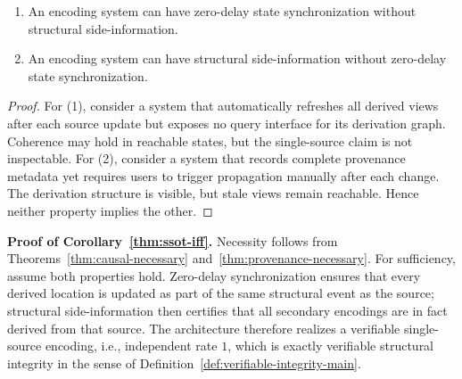 \begin{theorem}\label{thm:independence}
\begin{enumerate}
\tightlist
\item An encoding system can have zero-delay state synchronization without structural side-information.
\item An encoding system can have structural side-information without zero-delay state synchronization.
\end{enumerate}
\end{theorem}

\begin{proof}
For (1), consider a system that automatically refreshes all derived views after each source update but exposes no query interface for its derivation graph. Coherence may hold in reachable states, but the single-source claim is not inspectable. For (2), consider a system that records complete provenance metadata yet requires users to trigger propagation manually after each change. The derivation structure is visible, but stale views remain reachable. Hence neither property implies the other.
\end{proof}

\noindent\textbf{Proof of Corollary~\ref{thm:ssot-iff}.}
Necessity follows from Theorems~\ref{thm:causal-necessary} and~\ref{thm:provenance-necessary}. For sufficiency, assume both properties hold. Zero-delay synchronization ensures that every derived location is updated as part of the same structural event as the source; structural side-information then certifies that all secondary encodings are in fact derived from that source. The architecture therefore realizes a verifiable single-source encoding, i.e., independent rate $1$, which is exactly verifiable structural integrity in the sense of Definition~\ref{def:verifiable-integrity-main}.
